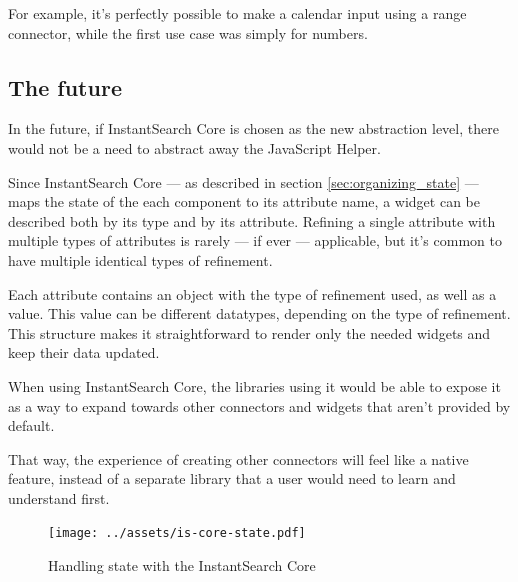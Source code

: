 For example, it's perfectly possible to make a calendar input using a range connector, while the first use case was simply for numbers.


\subsection{The future} %
\label{sub:the_future}

In the future, if InstantSearch Core is chosen as the new abstraction level, there would not be a need to abstract away the JavaScript Helper. 

Since InstantSearch Core --- as described in section \ref{sec:organizing_state} --- maps the state of the each component to its \gls{attribute} name, a widget can be described both by its type and by its attribute. Refining a single attribute with multiple types of attributes is rarely --- if ever --- applicable, but it's common to have multiple identical types of refinement.

Each attribute contains an object with the type of refinement used, as well as a value. This value can be different datatypes, depending on the type of refinement. This structure makes it straightforward to render only the needed widgets and keep their data updated.

When using InstantSearch Core, the libraries using it would be able to expose it as a way to expand towards other connectors and widgets that aren't provided by default.

That way, the experience of creating other connectors will feel like a native feature, instead of a separate \gls{library} that a user would need to learn and understand first.

\begin{figure}[H]
  \centering
  \texttt{[image: ../assets/is-core-state.pdf]}
  \caption{Handling state with the InstantSearch Core}
  \label{figure:is-core-state}
\end{figure}


